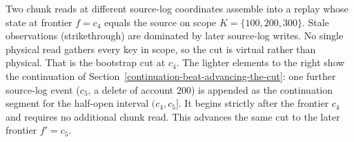 
\caption{Two chunk reads at different source-log coordinates assemble
into a replay whose state at frontier $f = c_4$ equals the source on
scope $K = \{100, 200, 300\}$. Stale observations (strikethrough) are
dominated by later source-log writes. No single physical read gathers
every key in scope, so the cut is virtual rather than physical.
That is the bootstrap cut at $c_4$. The lighter elements to the right
show the continuation of
Section~\ref{continuation-beat-advancing-the-cut}: one further
source-log event ($c_5$, a delete of account 200) is appended as the
continuation segment for the half-open interval $(c_4, c_5]$. It begins
strictly after the frontier $c_4$ and requires no additional chunk read. This advances
the same cut to the later frontier $f' = c_5$.}
\label{fig:running-example-timeline}
